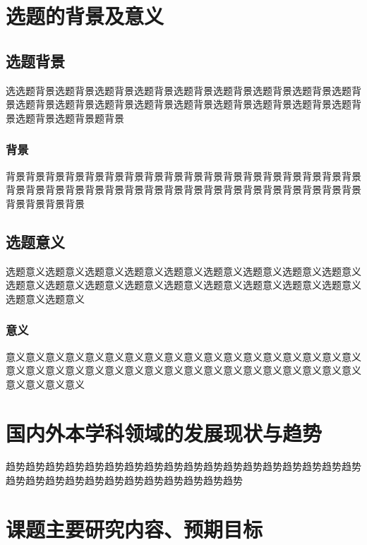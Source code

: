 \section{选题的背景及意义}

\subsection{选题背景}

选选题背景选题背景选题背景选题背景选题背景选题背景选题背景选题背景选题背景选题背景选题背景选题背景选题背景选题背景选题背景选题背景选题背景选题背景选题背景选题背景题背景

\subsubsection{背景}

背景背景背景背景背景背景背景背景背景背景背景背景背景背景背景背景背景背景背景背景背景背景背景背景背景背景背景背景背景背景背景背景背景背景背景背景背景背景背景背景

\subsection{选题意义}

选题意义选题意义选题意义选题意义选题意义选题意义选题意义选题意义选题意义选题意义选题意义选题意义选题意义选题意义选题意义选题意义选题意义选题意义选题意义选题意义

\subsubsection{意义}

意义意义意义意义意义意义意义意义意义意义意义意义意义意义意义意义意义意义意义意义意义意义意义意义意义意义意义意义意义意义意义意义意义意义意义意义意义意义意义意义

\section{国内外本学科领域的发展现状与趋势}

趋势趋势趋势趋势趋势趋势趋势趋势趋势趋势趋势趋势趋势趋势趋势趋势趋势趋势趋势趋势趋势趋势趋势趋势趋势趋势趋势趋势趋势趋势

\section{课题主要研究内容、预期目标}


